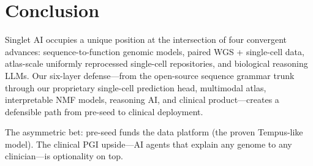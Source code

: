 \documentclass[10pt,twocolumn,letterpaper]{article}
\begin{document}
\section{Conclusion}
\label{sec:conclusion}

Singlet AI occupies a unique position at the intersection of four convergent
advances: sequence-to-function genomic models, paired WGS + single-cell data,
atlas-scale uniformly reprocessed single-cell repositories, and biological
reasoning LLMs. Our six-layer defense---from the open-source sequence grammar
trunk through our proprietary single-cell prediction head, multimodal atlas,
interpretable NMF models, reasoning AI, and clinical product---creates a
defensible path from pre-seed to clinical deployment.

The asymmetric bet: pre-seed funds the data platform (the proven Tempus-like
model). The clinical PGI upside---AI agents that explain any genome to any
clinician---is optionality on top.



\end{document}
